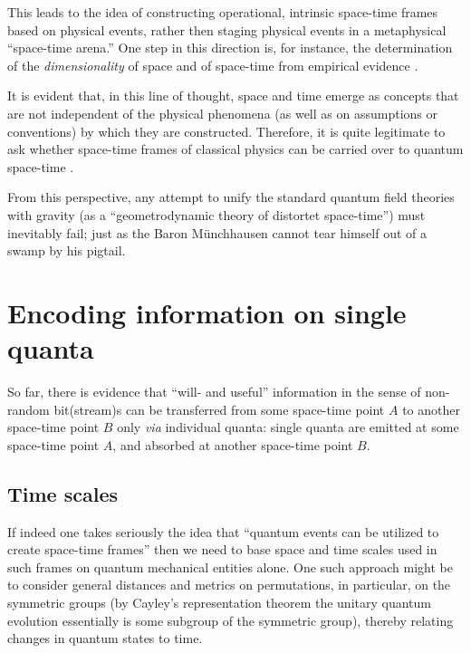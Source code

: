 \documentclass[%
  twocolumn,
 showpacs,
 showkeys,
 preprintnumbers,
 amsmath,amssymb,
 aps,
 prl,
  longbibliography,
 ]{revtex4-1}
\theoremstyle{definition}
\theoremstyle{remark}
\begin{document}
This leads to the idea of constructing operational, intrinsic space-time frames based on physical events,
rather then staging physical events in a metaphysical ``space-time arena.''
One step in this direction is, for instance, the determination of the {\em dimensionality} of space and of space-time from
empirical evidence \cite{sv2}.

It is evident that, in this line of thought, space and time emerge as concepts that are not independent of the physical phenomena
(as well as on assumptions or conventions) by which they are constructed.
Therefore, it is quite legitimate to ask whether space-time frames of classical physics can be
carried over to quantum space-time \cite{Kreinovich-94,Myrvold2002435}.

From this perspective, any attempt to unify the standard quantum field theories with gravity (as a ``geometrodynamic theory of distortet space-time'') must inevitably fail; just as the Baron M\"unchhausen cannot tear himself out of a swamp by his pigtail.


\section{Encoding information on single quanta}

So far, there is evidence that ``will- and useful''
information in the sense of non-random bit(stream)s  can be transferred from some space-time point $A$
to another space-time point $B$ only {\em via} individual quanta:
single quanta are emitted at some space-time point   $A$, and absorbed at another space-time point $B$.



\subsection{Time scales}

If indeed one takes seriously the idea that ``quantum events can be utilized to create space-time frames''
then we need to base space and time scales used in such frames on quantum mechanical entities alone.
One such approach might be to consider general distances and metrics on permutations, in particular,
on the symmetric groups
(by Cayley's representation theorem the unitary quantum evolution essentially is some subgroup of the symmetric group),
thereby relating changes in quantum states to time.
\end{document}

